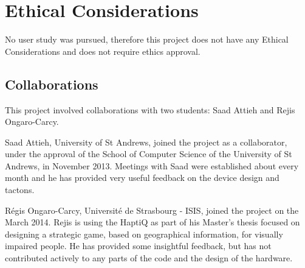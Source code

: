 \chapter{Ethical Considerations}

No user study was pursued, therefore this project does not have any Ethical Considerations and does not require ethics approval.\newline \par

\section{Collaborations}
This project involved collaborations with two students: Saad Attieh and Rejis Ongaro-Carcy.  

Saad Attieh, University of St Andrews, joined the project as a collaborator, under the approval of the School of Computer Science of the University of St Andrews, in November 2013. Meetings with Saad were established about every month and he has provided very useful feedback on the device design and tactons. 

Régis Ongaro-Carcy, Université de Strasbourg - ISIS, joined the project on the  March 2014. Rejis is using the HaptiQ as part of his Master's thesis focused on designing a strategic game, based on geographical information, for visually impaired people. He has provided some insightful feedback, but has not contributed actively to any parts of the code and the design of the hardware. 